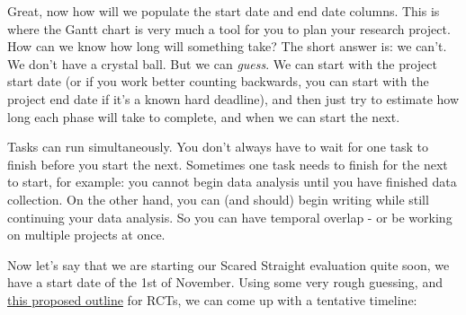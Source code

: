 \documentclass[
]{book}
\begin{document}
Great, now how will we populate the start date and end date columns. This is where the Gantt chart is very much a tool for you to plan your research project. How can we know how long will something take? The short answer is: we can't. We don't have a crystal ball. But we can \emph{guess}. We can start with the project start date (or if you work better counting backwards, you can start with the project end date if it's a known hard deadline), and then just try to estimate how long each phase will take to complete, and when we can start the next.

Tasks can run simultaneously. You don't always have to wait for one task to finish before you start the next. Sometimes one task needs to finish for the next to start, for example: you cannot begin data analysis until you have finished data collection. On the other hand, you can (and should) begin writing while still continuing your data analysis. So you can have temporal overlap - or be working on multiple projects at once.

Now let's say that we are starting our Scared Straight evaluation quite soon, we have a start date of the 1st of November. Using some very rough guessing, and \href{https://www.healthknowledge.org.uk/e-learning/epidemiology/practitioners/introduction-study-design-is-rct}{this proposed outline} for RCTs, we can come up with a tentative timeline:
\end{document}
